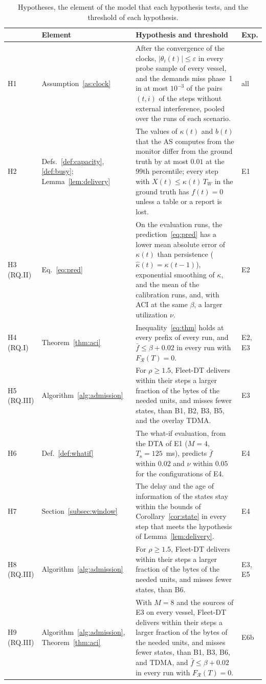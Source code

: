 \begin{table}[t]
\caption{Hypotheses, the element of the model that each hypothesis tests, and the threshold of each hypothesis.}\label{tab:hyp}
\centering\footnotesize
\begin{tabular}{@{}lp{1.3cm}p{4.9cm}l@{}}
\toprule
& Element & Hypothesis and threshold & Exp. \\
\midrule
H1 & Assumption~\ref{as:clock} & After the convergence of the clocks, $|\theta_i(t)| \leq \varepsilon$ in every probe sample of every vessel, and the demands miss phase~1 in at most $10^{-3}$ of the pairs $(t, i)$ of the steps without external interference, pooled over the runs of each scenario. & all \\
H2 & Defs.~\ref{def:capacity}, \ref{def:busy}; Lemma~\ref{lem:delivery} & The values of $\kappa(t)$ and $b(t)$ that the AS computes from the monitor differ from the ground truth by at most $0.01$ at the 99th percentile; every step with $X(t) \leq \kappa(t)\,T_W$ in the ground truth has $f(t) = 0$ unless a table or a report is lost. & E1 \\
H3 (RQ.II) & Eq.~\eqref{eq:pred} & On the evaluation runs, the prediction~\eqref{eq:pred} has a lower mean absolute error of $\kappa(t)$ than persistence ($\hat{\kappa}(t) = \kappa(t-1)$), exponential smoothing of $\kappa$, and the mean of the calibration runs, and, with ACI at the same $\beta$, a larger utilization $\nu$. & E2 \\
H4 (RQ.I) & Theorem~\ref{thm:aci} & Inequality~\eqref{eq:thm} holds at every prefix of every run, and $\bar{f} \leq \beta + 0.02$ in every run with $F_{\mathcal{R}}(T) = 0$. & E2, E3 \\
H5 (RQ.III) & Algorithm~\ref{alg:admission} & For $\rho \geq 1.5$, Fleet-DT delivers within their steps a larger fraction of the bytes of the needed units, and misses fewer states, than B1, B2, B3, B5, and the overlay TDMA. & E3 \\
H6 & Def.~\ref{def:whatif} & The what-if evaluation, from the DTA of E1 ($M = 4$, $T_{\mathrm{s}} = 125$~ms), predicts $\bar{f}$ within $0.02$ and $\nu$ within $0.05$ for the configurations of E4. & E4 \\
H7 & Section~\ref{subsec:window} & The delay and the age of information of the states stay within the bounds of Corollary~\ref{cor:state} in every step that meets the hypothesis of Lemma~\ref{lem:delivery}. & E4 \\
\midrule
H8 (RQ.III) & Algorithm~\ref{alg:admission} & For $\rho \geq 1.5$, Fleet-DT delivers within their steps a larger fraction of the bytes of the needed units, and misses fewer states, than B6. & E3, E5 \\
H9 (RQ.III) & Algorithm~\ref{alg:admission}, Theorem~\ref{thm:aci} & With $M = 8$ and the sources of E3 on every vessel, Fleet-DT delivers within their steps a larger fraction of the bytes of the needed units, and misses fewer states, than B1, B3, B6, and TDMA, and $\bar{f} \leq \beta + 0.02$ in every run with $F_{\mathcal{R}}(T) = 0$. & E6b \\
\bottomrule
\end{tabular}
\end{table}


